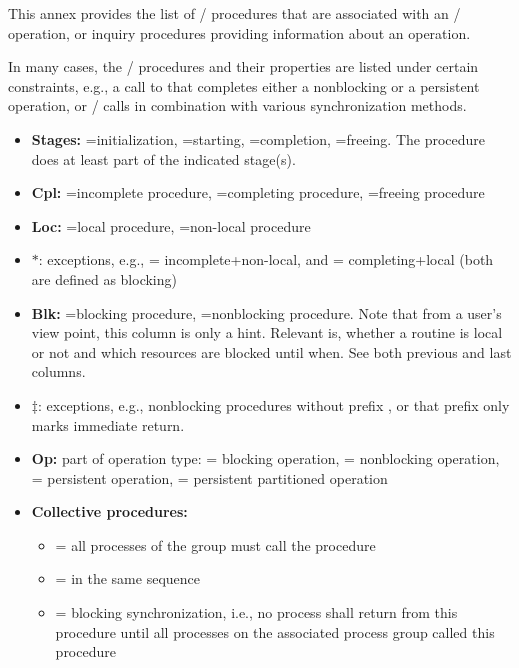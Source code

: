This annex 
provides the list of \MPI/ procedures that are associated with an \MPI/ 
operation, or inquiry procedures providing information about an operation.

In many cases, the \MPI/ procedures and their properties are listed under certain constraints,
e.g., a call to  that completes either a nonblocking or a persistent operation,
or \RMA/ calls in combination with various synchronization methods.

{\small
\begin{itemize}
\item \textbf{Stages:} =initialization, =starting, =completion, =freeing.
  The procedure does at least part
  of the indicated stage(s).
\item \textbf{Cpl:} =incomplete procedure, =completing procedure, =freeing procedure
\item \textbf{Loc:} =local procedure, =non-local procedure
\item \textbf{$*$}: exceptions, e.g.,  = incomplete+non-local, and  = completing+local (both are defined as blocking)
\item \textbf{Blk:} =blocking procedure, =nonblocking procedure. Note that from a user's view point, this column is only a hint. Relevant is,
         whether a routine is local or not and which resources are blocked until when. See both previous and last columns.
\item  \textbf{$\ddagger$}: exceptions, e.g., nonblocking procedures without prefix , or that prefix  only marks immediate return.
\item \textbf{Op:} part of operation type:  = blocking operation,
  = nonblocking operation,  = persistent operation,
  = persistent partitioned operation
\item \textbf{Collective procedures:}
\begin{itemize}
     \item {} = all processes of the group must call the procedure
     \item {} = in the same sequence
     \item {} = blocking synchronization, i.e., no process shall return from this procedure
                      until all processes on the associated process group called this procedure

\end{itemize}
\end{itemize}}
